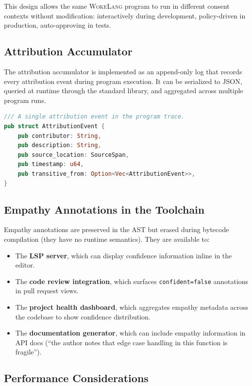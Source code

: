 \documentclass[11pt,a4paper]{article}
\newcommand{\WokeLang}{\textsc{WokeLang}}
\begin{document}
This design allows the same \WokeLang{} program to run in different
consent contexts without modification: interactively during
development, policy-driven in production, auto-approving in tests.

\subsection{Attribution Accumulator}

The attribution accumulator is implemented as an append-only log that
records every attribution event during program execution.  It can be
serialized to JSON, queried at runtime through the standard library,
and aggregated across multiple program runs.

\begin{lstlisting}[language=Rust,caption={Attribution event structure}]
/// A single attribution event in the program trace.
pub struct AttributionEvent {
    pub contributor: String,
    pub description: String,
    pub source_location: SourceSpan,
    pub timestamp: u64,
    pub transitive_from: Option<Vec<AttributionEvent>>,
}
\end{lstlisting}

\subsection{Empathy Annotations in the Toolchain}

Empathy annotations are preserved in the AST but erased during
bytecode compilation (they have no runtime semantics).  They are
available to:

\begin{itemize}[leftmargin=*]
  \item The \textbf{LSP server}, which can display confidence
    information inline in the editor.
  \item The \textbf{code review integration}, which surfaces
    \texttt{confident=false} annotations in pull request views.
  \item The \textbf{project health dashboard}, which aggregates
    empathy metadata across the codebase to show confidence
    distribution.
  \item The \textbf{documentation generator}, which can include
    empathy information in API docs (``the author notes that edge case
    handling in this function is fragile'').
\end{itemize}

\subsection{Performance Considerations}
\end{document}
